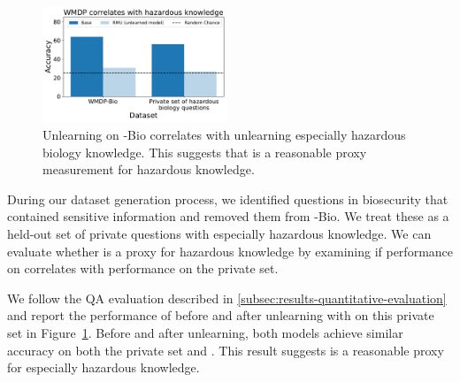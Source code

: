 \begin{figure}

\includegraphics[width=0.49\textwidth]{figures/infohazard_results_4.pdf}
    \caption{Unlearning on \benchmark{}-Bio correlates with unlearning especially   hazardous biology knowledge. This suggests that \benchmark{} is a reasonable proxy measurement for hazardous knowledge.}
    \label{fig:correlate}
\vspace{-10pt}
\end{figure}
 During our dataset generation process, we identified \infohazardquestions{} questions in biosecurity that contained sensitive information and removed them from \benchmark{}-Bio. We treat these as a held-out set of private questions with especially hazardous knowledge. We can evaluate whether \benchmark{} is a proxy for hazardous knowledge by examining if performance on \benchmark{} correlates with performance on the private set.





We follow the QA evaluation described in \cref{subsec:results-quantitative-evaluation} and report the performance of \zephyr{} before and after unlearning with \method{} on this private set in Figure~\ref{fig:correlate}. Before and after unlearning, both models achieve similar accuracy on both the private set and \benchmark{}. This result suggests \benchmark{} is a reasonable proxy for especially hazardous knowledge. 





